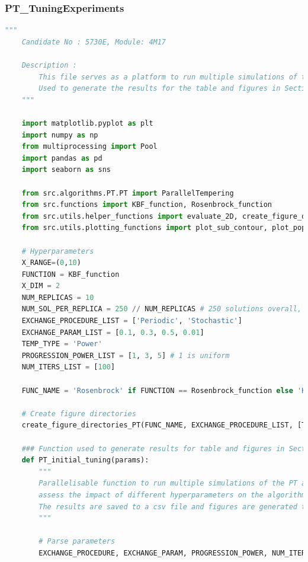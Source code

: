 \documentclass[10pt]{article}
\begin{document}
\subsubsection{PT\_TuningExperiments}
\label{sec:PT_TuningExperiments}
\begin{lstlisting}[language=Python, caption=PT\_TuningExperiments.py, label=PT_TuningExperimentspy]
    """
    Candidate No : 5730E, Module: 4M17 
    
    Description :
        This file serves as a platform to run multiple simulations of the PT algorithm.
        Used to generate the results for the table and figures in Section 4.2 of the report.                     
    """
    
    import matplotlib.pyplot as plt
    import numpy as np
    from multiprocessing import Pool
    import pandas as pd
    import seaborn as sns
    
    from src.algorithms.PT.PT import ParallelTempering
    from src.functions import KBF_function, Rosenbrock_function
    from src.utils.helper_functions import evaluate_2D, create_figure_directories_PT
    from src.utils.plotting_functions import plot_sub_contour, plot_population, plot_fitness, plot_temp_progressions
    
    # Hyperparameters
    X_RANGE=(0,10)
    FUNCTION = KBF_function
    X_DIM = 2
    NUM_REPLICAS = 10
    NUM_SOL_PER_REPLICA = 250 // NUM_REPLICAS # 250 solutions overall, same as CGA population
    EXCHANGE_PROCEDURE_LIST = ['Periodic', 'Stochastic']
    EXCHANGE_PARAM_LIST = [0.1, 0.3, 0.5, 0.01]
    TEMP_TYPE = 'Power'
    PROGRESSION_POWER_LIST = [1, 3, 5] # 1 is uniform
    NUM_ITERS_LIST = [100]
    
    FUNC_NAME = 'Rosenbrock' if FUNCTION == Rosenbrock_function else 'KBF'
    
    # Create figure directories
    create_figure_directories_PT(FUNC_NAME, EXCHANGE_PROCEDURE_LIST, [TEMP_TYPE], NUM_ITERS_LIST)
    
    ### Function used to generate results for table and figures in Section 4.2/Appendix of the report ###
    def PT_initial_tuning(params):
        """
        Parallelisable function to run multiple simulations of the PT algorithm and 
        assess the impact of different hyperparameters on the algorithm's performance.
        The results are saved to a csv file and figures are generated to visualise the results.
        """
    
        # Parse parameters
        EXCHANGE_PROCEDURE, EXCHANGE_PARAM, PROGRESSION_POWER, NUM_ITERS = params 
    

\end{lstlisting}
\end{document}
